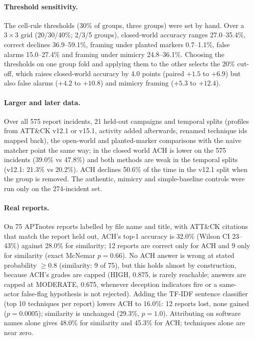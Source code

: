 \documentclass[11pt]{article}
\begin{document}
\paragraph{Threshold sensitivity.} The cell-rule thresholds (30\% of groups,
three groups) were set by hand. Over a $3\times3$ grid (20/30/40\%; 2/3/5
groups), closed-world accuracy ranges 27.0--35.4\%, correct declines
36.9--59.1\%, framing under planted markers 0.7--1.1\%, false alarms
15.0--27.4\% and framing under mimicry 24.8--36.1\%. Choosing the thresholds
on one group fold and applying them to the other selects the 20\% cut-off,
which raises closed-world accuracy by 4.0 points (paired $+1.5$ to $+6.9$) but
also false alarms ($+4.2$ to $+10.8$) and mimicry framing ($+5.3$ to $+12.4$).
\paragraph{Larger and later data.} Over all 575 report incidents, 21 held-out
campaigns and temporal splits (profiles from ATT\&CK v12.1 or v15.1,
activity added afterwards, renamed technique ids mapped back), the open-world
and planted-marker comparisons with the naive matcher point the same way; in
the closed world ACH is lower on the 575 incidents (39.0\% vs 47.8\%) and both
methods are weak in the temporal splits (v12.1: 21.3\% vs 20.2\%). ACH declines
50.6\% of the time in the v12.1 split when the group is removed. The authentic,
mimicry and simple-baseline controls were run only on the 274-incident set.
\paragraph{Real reports.} On 75 APTnotes reports labelled by file name and
title, with ATT\&CK citations that match the report held out, ACH's top-1
accuracy is 32.0\% (Wilson CI 23--43\%) against 28.0\% for similarity; 12
reports are correct only for ACH and 9 only for similarity (exact McNemar
$p=0.66$). No ACH answer is wrong at stated probability $\ge 0.8$ (similarity:
9 of 75), but this holds almost by construction, because ACH's grades are
capped (HIGH, 0.875, is rarely reachable; answers are capped at MODERATE,
0.675, whenever deception indicators fire or a same-actor false-flag
hypothesis is not rejected). Adding the TF-IDF sentence classifier (top 10
techniques per report) lowers ACH to 16.0\%: 12 reports lost, none gained
($p=0.0005$); similarity is unchanged (29.3\%, $p=1.0$). Attributing on
software names alone gives 48.0\% for similarity and 45.3\% for ACH; techniques
alone are near zero.
\end{document}
